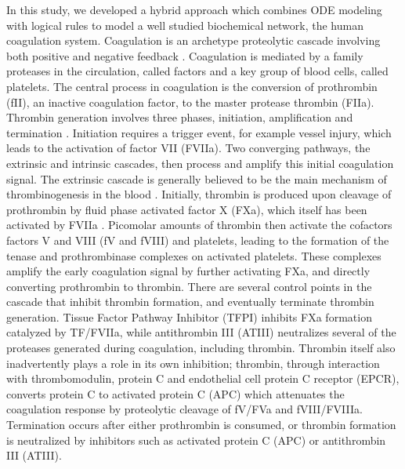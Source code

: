 \documentclass[12pt]{article}
\begin{document}
In this study, we developed a hybrid approach which combines ODE modeling with logical rules to model a well studied biochemical network, 
the human coagulation system. Coagulation is an archetype proteolytic cascade involving both positive 
and negative feedback \cite{Butenas:2002aa,Schenone:2004aa,Adams:2009aa}. 
Coagulation is mediated by a family proteases in the circulation, called factors and a key group of blood cells, called platelets. 
The central process in coagulation is the conversion of prothrombin (fII), an inactive coagulation factor, to the master protease thrombin (FIIa).
Thrombin generation involves three phases, initiation, amplification and termination \cite{GOLDHABER2006, Brummel:2002aa}.
Initiation requires a trigger event, for example vessel injury, which leads to the activation of factor VII (FVIIa).
Two converging pathways, the extrinsic and intrinsic cascades, then process and amplify this initial coagulation signal. 
The extrinsic cascade is generally believed to be the main mechanism of thrombinogenesis in the blood \cite{MANN1990,ROBERTS1998,MANN1999}.
Initially, thrombin is produced upon cleavage of prothrombin by fluid phase activated factor X (FXa), which itself has been activated by FVIIa \cite{Butenas:2002aa}. 
Picomolar amounts of thrombin then activate the cofactors factors V and VIII (fV and fVIII) and platelets, 
leading to the formation of the tenase and prothrombinase complexes on activated platelets.
These complexes amplify the early coagulation signal by further activating FXa, and directly converting prothrombin to thrombin. 
There are several control points in the cascade that inhibit thrombin formation, and eventually terminate thrombin generation. 
Tissue Factor Pathway Inhibitor (TFPI) inhibits FXa formation catalyzed by TF/FVIIa, while antithrombin III (ATIII)
neutralizes several of the proteases generated during coagulation, including thrombin.  
Thrombin itself also inadvertently plays a role in its own inhibition; thrombin, through interaction with thrombomodulin, protein C and endothelial cell protein C receptor (EPCR),
converts protein C to activated protein C (APC) which attenuates the coagulation response by proteolytic cleavage of fV/FVa and fVIII/FVIIIa. 
Termination occurs after either prothrombin is consumed, or thrombin formation is neutralized by inhibitors such as activated protein C (APC) or antithrombin III (ATIII).   
\end{document}
